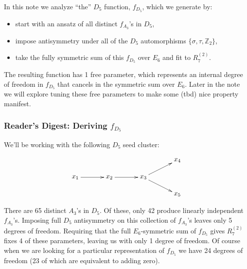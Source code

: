 \documentclass[12pt]{article}
\def\a{\mathcal{A}}
\def\fd5{f_{D_5}}
\def\fa3{f_{A_3}}
\def\a2{A_2}
\def\a3{A_3}
\def\d5{D_5}
\def\e6{E_6}
\def\r27{R^{(2)}_7}
\begin{document}
\thispagestyle{fancyplain}
 
\fancyhf{} 
 
\cfoot{\fancyplain{}{\thepage}}

\lhead{\textbf{Describing the $\d5$ function} \hfill \today}

In this note we analyze ``the'' $\d5$ function, $\fd5$, which we generate by:
\begin{itemize}
	\item start with an ansatz of all distinct $\fa3$'s in $\d5$,
	\item impose antisymmetry under all of the $\d5$ automorphisms $\{\sigma, \tau, \mathbb{Z}_2\}$,
	\item take the fully symmetric sum of this $\fd5$ over $\e6$ and fit to $\r27$.
\end{itemize}
The resulting function has 1 free parameter, which represents an internal degree of freedom in $\fd5$ that cancels in the symmetric sum over $\e6$. Later in the note we will explore tuning these free parameters to make some (tbd) nice property manifest.

\subsubsection*{Reader's Digest: Deriving $\fd5$}

We'll be working with the following $\d5$ seed cluster:

\begin{equation}
\begin{gathered}
\begin{xy} 0;<1pt,0pt>:<0pt,-1pt>::
	(0,25) *+{x_1} ="1",
	(50,25) *+{x_2} ="2",
	(100,25) *+{x_3} ="3",
	(150,0) *+{x_4} ="4",
	(150,50) *+{x_5} ="5",
	"1", {\ar"2"},
	"2", {\ar"3"},
	"3", {\ar"4"},
	"3", {\ar"5"},
\end{xy}
\end{gathered}
\end{equation}

There are 65 distinct $\a3$'s in $\d5$. Of these, only 42 produce linearly independent $\fa3$'s. Imposing full $\d5$ antisymmetry on this collection of $\fa3$'s leaves only 5 degrees of freedom. Requiring that the full $\e6$-symmetric sum of $\fd5$ gives $\r27$ fixes 4 of these parameters, leaving us with only 1 degree of freedom. Of course when we are looking for a particular representation of $\fd5$ we have 24 degrees of freedom (23 of which are equivalent to adding zero).\\
\end{document}
